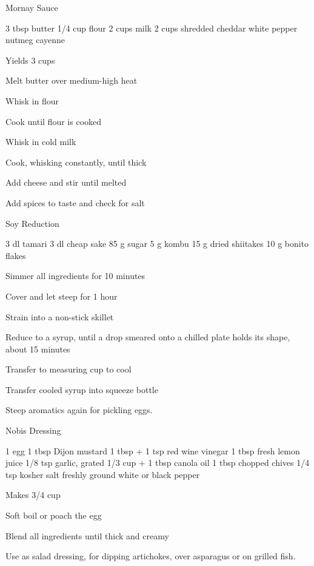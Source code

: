 \begin{recipe}{Mornay Sauce}{}
\begin{ingredients}
3 tbsp butter
1/4 cup flour
2 cups milk
2 cups shredded \ibreak cheddar
white pepper
nutmeg
cayenne
\end{ingredients}
\nextcolumn
Yields 3 cups
\begin{steps}
    \item Melt butter over medium-high heat
    \item Whisk in flour
    \item Cook until flour is cooked
    \item Whisk in cold milk
    \item Cook, whisking constantly, until thick
    \item Add cheese and stir until melted
    \item Add spices to taste and check for salt
\end{steps}
\end{recipe}

\begin{recipe}{Soy Reduction}{}
\begin{ingredients}
3 dl tamari
3 dl cheap sake
85 g sugar
5 g kombu
15 g dried shiitakes
10 g bonito flakes
\end{ingredients}
\nextcolumn
\begin{steps}
    \item Simmer all ingredients for 10 minutes
    \item Cover and let steep for 1 hour
    \item Strain into a non-stick skillet
    \item Reduce to a syrup, until a drop smeared onto a chilled plate holds its shape, about 15 minutes
    \item Transfer to measuring cup to cool
    \item Transfer cooled syrup into squeeze bottle
\end{steps}
Steep aromatics again for pickling eggs.
\end{recipe}

\begin{denserecipe}{Nobis Dressing}{}
\begin{ingredients}
1 egg
1 tbsp Dijon mustard
1 tbsp + 1 tsp red wine vinegar
1 tbsp fresh lemon juice
1/8 tsp garlic, grated
1/3 cup + 1 tbsp canola oil
1 tbsp chopped chives
1/4 tsp kosher salt
freshly ground white or black pepper
\end{ingredients}
\nextcolumn
Makes 3/4 cup
\begin{steps}
\item Soft boil or poach the egg
\item Blend all ingredients until thick and creamy
\end{steps}

Use as salad dressing, for dipping artichokes, over asparagus or on grilled fish.
\end{denserecipe}

